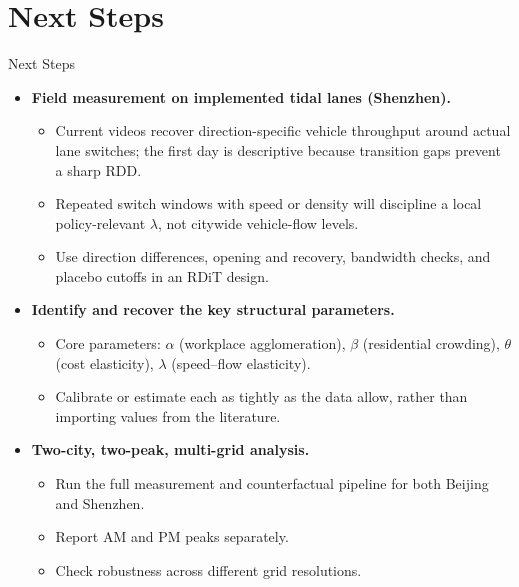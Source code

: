 \documentclass[11pt,aspectratio=169]{beamer}
\newcommand{\good}[1]{\textcolor{blue!70!black}{#1}}
\newcommand{\app}[1]{\allowbreak\hspace{0.25em}\hyperlink{#1}{\beamergotobutton{details}}}
\begin{document}
\section{Next Steps}
\begin{frame}[label=nextsteps]{Next Steps}
\small
\begin{itemize}
  \item \textbf{Field measurement on implemented tidal lanes (Shenzhen).}
  \begin{itemize}\footnotesize
    \item Current videos recover direction-specific vehicle throughput around actual lane switches; the first day is descriptive because transition gaps prevent a sharp RDD.
    \item Repeated switch windows with speed or density will discipline a local policy-relevant $\lambda$, not citywide vehicle-flow levels.
    \item Use direction differences, opening and recovery, bandwidth checks, and placebo cutoffs in an RDiT design. \app{appfieldvisit}
  \end{itemize}
  \item \textbf{Identify and recover the key structural parameters.}
  \begin{itemize}\footnotesize
    \item Core parameters: $\alpha$ (workplace agglomeration), $\beta$ (residential crowding), $\theta$ (cost elasticity), $\lambda$ (speed--flow elasticity).
    \item Calibrate or estimate each as tightly as the data allow, rather than importing values from the literature.
  \end{itemize}
  \item \textbf{Two-city, two-peak, multi-grid analysis.}
  \begin{itemize}\footnotesize
    \item Run the full measurement and counterfactual pipeline for both \good{Beijing} and \good{Shenzhen}.
    \item Report \good{AM} and \good{PM} peaks separately.
    \item Check robustness across different grid resolutions.
  \end{itemize}
\end{itemize}
\end{frame}

\appendix
\end{document}
